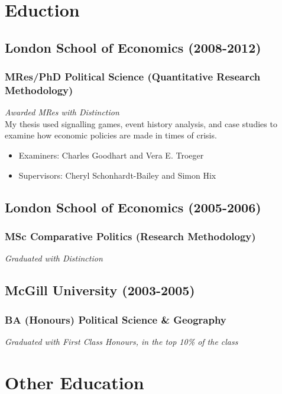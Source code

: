 \documentclass[a4paper]{article}
\begin{document}
{%
\section*{Eduction}

\subsection*{London School of Economics (2008-2012)}
\subsubsection*{MRes/PhD Political Science (Quantitative Research Methodology)}

\emph{Awarded MRes with Distinction} \\

\noindent My thesis used signalling games, event history analysis, and case studies to examine how economic policies are made in times of crisis.

\begin{itemize}
    \item Examiners: Charles Goodhart and Vera E. Troeger
    \item Supervisors: Cheryl Schonhardt-Bailey and Simon Hix
\end{itemize}

\subsection*{London School of Economics (2005-2006)}
\subsubsection*{MSc Comparative Politics (Research Methodology)}

{\emph{Graduated with Distinction}}

\subsection*{McGill University (2003-2005)}
\subsubsection*{BA (Honours) Political Science \& Geography}

{\emph{Graduated with First Class Honours, in the top 10\% of the class}}

\section*{Other Education}

}
\end{document}
